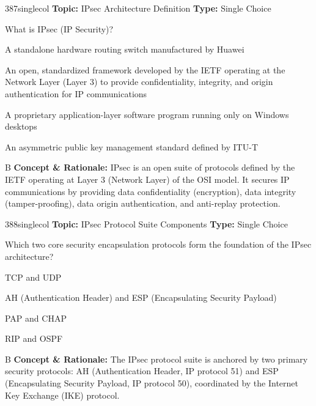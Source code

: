 \begin{qcard}{387}{singlecol}
\textcolor{darkslate!75}{\small\textbf{Topic:} IPsec Architecture Definition \hfill \textbf{Type:} Single Choice}\vspace{0.4em}\par
What is IPsec (IP Security)?
\begin{qoptions}
\item A standalone hardware routing switch manufactured by Huawei
\item An open, standardized framework developed by the IETF operating at the Network Layer (Layer 3) to provide confidentiality, integrity, and origin authentication for IP communications
\item A proprietary application-layer software program running only on Windows desktops
\item An asymmetric public key management standard defined by ITU-T
\end{qoptions}
\end{qcard}
\nopagebreak
\begin{explainbox}{B}
\textbf{Concept \& Rationale:} IPsec is an open suite of protocols defined by the IETF operating at Layer 3 (Network Layer) of the OSI model. It secures IP communications by providing data confidentiality (encryption), data integrity (tamper-proofing), data origin authentication, and anti-replay protection.
\end{explainbox}

\begin{qcard}{388}{singlecol}
\textcolor{darkslate!75}{\small\textbf{Topic:} IPsec Protocol Suite Components \hfill \textbf{Type:} Single Choice}\vspace{0.4em}\par
Which two core security encapsulation protocols form the foundation of the IPsec architecture?
\begin{qoptions}
\item TCP and UDP
\item AH (Authentication Header) and ESP (Encapsulating Security Payload)
\item PAP and CHAP
\item RIP and OSPF
\end{qoptions}
\end{qcard}
\nopagebreak
\begin{explainbox}{B}
\textbf{Concept \& Rationale:} The IPsec protocol suite is anchored by two primary security protocols: AH (Authentication Header, IP protocol 51) and ESP (Encapsulating Security Payload, IP protocol 50), coordinated by the Internet Key Exchange (IKE) protocol.
\end{explainbox}

